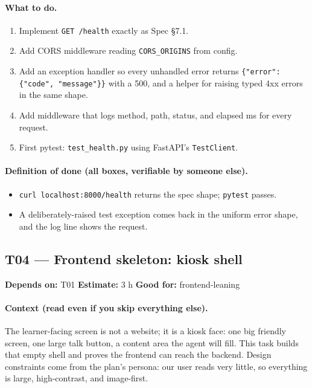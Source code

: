 \documentclass[11pt]{article}
\newcommand{\code}[1]{\texttt{#1}}
\newcommand{\taskmeta}[3]{\noindent\textbf{Depends on:} #1 \quad\textbullet\quad \textbf{Estimate:} #2 \quad\textbullet\quad \textbf{Good for:} #3\par\vspace{2pt}}
\newcommand{\ctx}[1]{\paragraph{Context (read even if you skip everything else).} #1}
\newcommand{\dod}{\paragraph{Definition of done (all boxes, verifiable by someone else).}}
\begin{document}
\paragraph{What to do.}
\begin{enumerate}
  \item Implement \code{GET /health} exactly as Spec \S7.1.
  \item Add CORS middleware reading \code{CORS\_ORIGINS} from config.
  \item Add an exception handler so every unhandled error returns \code{\{"error": \{"code", "message"\}\}} with a 500, and a helper for raising typed 4xx errors in the same shape.
  \item Add middleware that logs method, path, status, and elapsed ms for every request.
  \item First pytest: \code{test\_health.py} using FastAPI's \code{TestClient}.
\end{enumerate}
\dod
\begin{itemize}
  \item \code{curl localhost:8000/health} returns the spec shape; \code{pytest} passes.
  \item A deliberately-raised test exception comes back in the uniform error shape, and the log line shows the request.
\end{itemize}

\subsection{T04 --- Frontend skeleton: kiosk shell \dag}
\taskmeta{T01}{3 h}{frontend-leaning}
\ctx{The learner-facing screen is not a website; it is a kiosk face: one big friendly screen, one large talk button, a content area the agent will fill. This task builds that empty shell and proves the frontend can reach the backend. Design constraints come from the plan's persona: our user reads very little, so everything is large, high-contrast, and image-first.}
\end{document}
